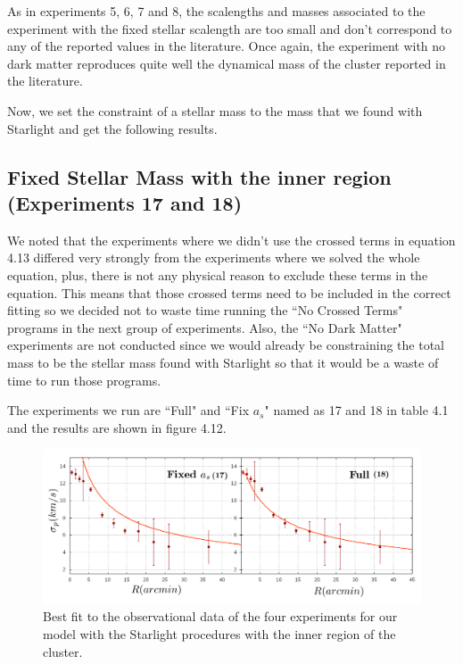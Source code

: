 As in experiments 5, 6, 7 and 8, the scalengths and masses associated to the experiment with the fixed stellar scalength are too small and don't correspond to any of the reported values in the literature. Once again, the experiment with no dark matter reproduces quite well the dynamical mass of the cluster reported in the literature.

Now, we set the constraint of a stellar mass to the mass that we found with Starlight and get the following results.

\subsection{Fixed Stellar Mass with the inner region (Experiments 17 and 18)}

We noted that the experiments where we didn't use the crossed terms in equation 4.13 differed very strongly from the experiments where we solved the whole equation, plus, there is not any physical reason to exclude these terms in the equation. This means that those crossed terms need to be included in the correct fitting so we decided not to waste time running the ``No Crossed Terms" programs in the next group of experiments. Also, the ``No Dark Matter" experiments are not conducted since we would already be constraining the total mass to be the stellar mass found with Starlight so that it would be a waste of time to run those programs.

The experiments we run are ``Full" and ``Fix $a_s$" named as 17 and 18 in table 4.1 and the results are shown in figure 4.12.

\begin{figure}[H]
\centering
\includegraphics[width=15cm]{images/Starlight_2.png}
\caption[Best fit of our model with the mass found with the Starlight procedures with the inner region]{Best fit to the observational data of the four experiments for our model with the Starlight procedures with the inner region of the cluster.}
\end{figure}

